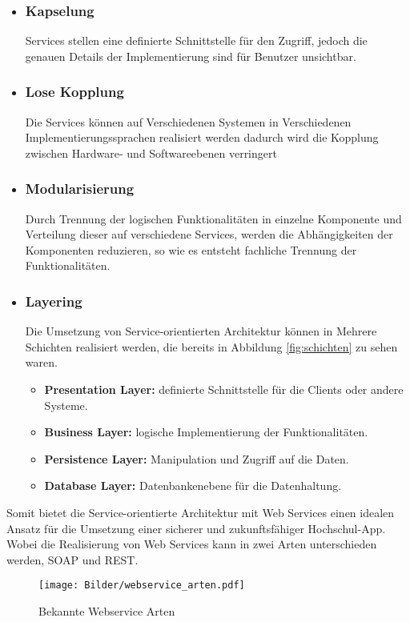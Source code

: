 \begin{itemize}
\item \subsubsection*{Kapselung} Services stellen eine definierte Schnittstelle für den Zugriff, jedoch die genauen Details der Implementierung sind für Benutzer unsichtbar.

\item \subsubsection*{Lose Kopplung} Die Services können auf Verschiedenen Systemen in Verschiedenen Implementierungssprachen realisiert werden dadurch wird die Kopplung zwischen Hardware- und Softwareebenen verringert
\item \subsubsection*{Modularisierung} Durch Trennung der logischen Funktionalitäten in einzelne Komponente und Verteilung dieser auf verschiedene Services, werden die Abhängigkeiten der Komponenten reduzieren, so wie es entsteht fachliche Trennung der Funktionalitäten. 
\item \subsubsection*{Layering} Die Umsetzung von Service-orientierten Architektur können in Mehrere Schichten realisiert werden, die bereits in Abbildung \ref{fig:schichten} zu sehen waren.
\begin{itemize}
\item \textbf{Presentation Layer:} definierte Schnittstelle für die Clients oder andere Systeme.
\item \textbf{Business Layer:} logische Implementierung der Funktionalitäten.
\item \textbf{Persistence Layer:} Manipulation und Zugriff auf die Daten.
\item \textbf{Database Layer:} Datenbankenebene für die Datenhaltung.
\end{itemize}
\end{itemize}

Somit bietet die Service-orientierte Architektur mit Web Services einen idealen Ansatz für die Umsetzung einer sicherer und zukunftsfähiger Hochschul-App. Wobei die Realisierung von Web Services kann in zwei Arten unterschieden werden, SOAP und REST.
\begin{figure}[H]
\centering
\texttt{[image: Bilder/webservice\_arten.pdf]}
\caption{Bekannte Webservice Arten\label{fig:wsarten}}
\end{figure}

